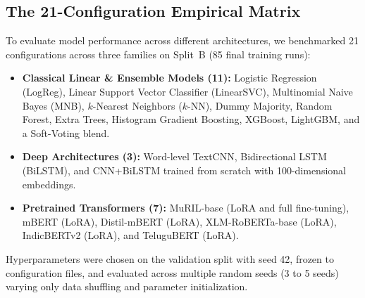 \documentclass[10pt,conference]{IEEEtran}
\begin{document}
\subsection{The 21-Configuration Empirical Matrix}
To evaluate model performance across different architectures, we benchmarked 21 configurations across three families on Split~B (85 final training runs):
\begin{itemize}
    \item \textbf{Classical Linear \& Ensemble Models (11):} Logistic Regression (LogReg), Linear Support Vector Classifier (LinearSVC), Multinomial Naive Bayes (MNB), $k$-Nearest Neighbors ($k$-NN), Dummy Majority, Random Forest, Extra Trees, Histogram Gradient Boosting, XGBoost, LightGBM, and a Soft-Voting blend.
    \item \textbf{Deep Architectures (3):} Word-level TextCNN, Bidirectional LSTM (BiLSTM), and CNN+BiLSTM trained from scratch with 100-dimensional embeddings.
    \item \textbf{Pretrained Transformers (7):} MuRIL-base (LoRA and full fine-tuning), mBERT (LoRA), Distil-mBERT (LoRA), XLM-RoBERTa-base (LoRA), IndicBERTv2 (LoRA), and TeluguBERT (LoRA).
\end{itemize}
Hyperparameters were chosen on the validation split with seed 42, frozen to configuration files, and evaluated across multiple random seeds (3 to 5 seeds) varying only data shuffling and parameter initialization.
\end{document}
